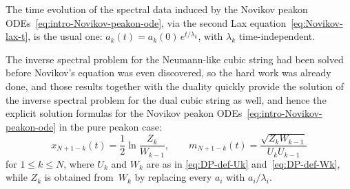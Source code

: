 \documentclass[10pt,a4paper]{article} \pdfoutput=1 
\begin{document}
The time evolution of the spectral data induced by the Novi\-kov
peakon ODEs~\eqref{eq:intro-Novikov-peakon-ode},
via the second Lax equation~\eqref{eq:Novikov-lax-t},
is the usual one: $a_k(t) = a_k(0) \, e^{t / \lambda_k}$,
with $\lambda_k$ time-independent.

The inverse spectral problem for the Neumann-like cubic string had been
solved~\cite{kohlenberg-lundmark-szmigielski:2007:inverse-spectral-discrete-cubic-string}
before Novikov's equation was even discovered,
so the hard work was already done,
and those results together with the duality quickly provide the
solution of the inverse spectral problem for the dual cubic string as well,
and hence the explicit solution formulas
for the Novikov peakon ODEs~\eqref{eq:intro-Novikov-peakon-ode} in the pure peakon case:
\begin{equation}
  \label{eq:Novikov-n-peakon-solution}
  x_{N+1-k}(t) = \frac12 \ln\frac{Z_k}{W_{k-1}}
  , \qquad
  m_{N+1-k}(t) = \frac{\sqrt{Z_k W_{k-1}}}{U_k U_{k-1}}
\end{equation}
for $1 \le k \le N$,
where $U_k$ and $W_k$ are as in \eqref{eq:DP-def-Uk} and~\eqref{eq:DP-def-Wk},
while $Z_k$ is obtained from~$W_k$ by replacing every $a_i$ with $a_i/\lambda_i$.
\end{document}
